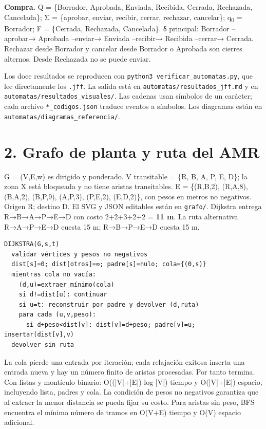 \documentclass[12pt,a4paper]{article}
\begin{document}
\textbf{Compra.} Q = \{Borrador, Aprobada, Enviada, Recibida, Cerrada, Rechazada, Cancelada\}; Σ = \{aprobar, enviar, recibir, cerrar, rechazar, cancelar\}; q\textsubscript{0} = Borrador; F = \{Cerrada, Rechazada, Cancelada\}. δ principal: Borrador --aprobar→ Aprobada --enviar→ Enviada --recibir→ Recibida --cerrar→ Cerrada. Rechazar desde Borrador y cancelar desde Borrador o Aprobada son cierres alternos. Desde Rechazada no se puede enviar.


Los doce resultados se reproducen con \texttt{python3 verificar\_automatas.py}, que lee directamente los \texttt{.jff}. La salida está en \texttt{automatas/resultados\_jff.md} y en \texttt{automatas/resultados\_visuales/}. Las cadenas usan símbolos de un carácter; cada archivo \texttt{*\_codigos.json} traduce eventos a símbolos. Los diagramas están en \texttt{automatas/diagramas\_referencia/}.


\section{2. Grafo de planta y ruta del AMR}

G = (V,E,w) es dirigido y ponderado. V transitable = \{R, B, A, P, E, D\}; la zona X está bloqueada y no tiene aristas transitables. E = \{(R,B,2), (R,A,8), (B,A,2), (B,P,9), (A,P,3), (P,E,2), (E,D,2)\}, con pesos en metros no negativos. Origen R; destino D. El SVG y JSON editables están en \texttt{grafo/}. Dijkstra entrega R→B→A→P→E→D con costo 2+2+3+2+2 = \textbf{11 m}. La ruta alternativa R→A→P→E→D cuesta 15 m; R→B→P→E→D cuesta 15 m.


\begin{verbatim}
DIJKSTRA(G,s,t)
  validar vértices y pesos no negativos
  dist[s]=0; dist[otros]=∞; padre[s]=nulo; cola={(0,s)}
  mientras cola no vacía:
    (d,u)=extraer_mínimo(cola)
    si d!=dist[u]: continuar
    si u=t: reconstruir por padre y devolver (d,ruta)
    para cada (u,v,peso):
      si d+peso<dist[v]: dist[v]=d+peso; padre[v]=u; insertar(dist[v],v)
  devolver sin ruta
\end{verbatim}

La cola pierde una entrada por iteración; cada relajación exitosa inserta una entrada nueva y hay un número finito de aristas procesadas. Por tanto termina. Con listas y montículo binario: O((|V|+|E|) log |V|) tiempo y O(|V|+|E|) espacio, incluyendo lista, padres y cola. La condición de pesos no negativos garantiza que al extraer la menor distancia se pueda fijar su costo. Para aristas sin peso, BFS encuentra el mínimo número de tramos en O(V+E) tiempo y O(V) espacio adicional.
\end{document}
